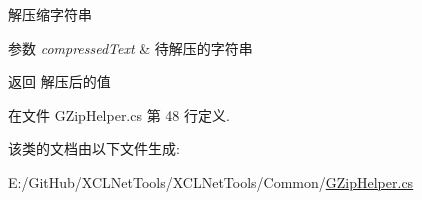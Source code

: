 解压缩字符串 


\begin{DoxyParams}{参数}
{\em compressed\+Text} & 待解压的字符串\\
\hline
\end{DoxyParams}
\begin{DoxyReturn}{返回}
解压后的值
\end{DoxyReturn}


在文件 G\+Zip\+Helper.\+cs 第 48 行定义.



该类的文档由以下文件生成\+:\begin{DoxyCompactItemize}
\item 
E\+:/\+Git\+Hub/\+X\+C\+L\+Net\+Tools/\+X\+C\+L\+Net\+Tools/\+Common/\hyperlink{_g_zip_helper_8cs}{G\+Zip\+Helper.\+cs}\end{DoxyCompactItemize}
